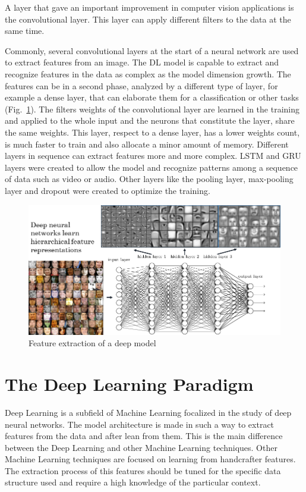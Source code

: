 \documentclass[12pt]{report}
\begin{document}
A layer that gave an important improvement in computer vision applications is the
convolutional layer. This layer can apply different filters to the data at the same time.

Commonly, several convolutional layers at the start of a neural network are used to extract features from an image. 
The DL model is capable to extract and recognize features in the data as complex as the model dimension growth.
The features can be in a second phase, analyzed by a different type of layer, for example a dense layer, that can elaborate them for a classification or other tasks (Fig.~\ref{fig:featuresextract}).
The filters weights of the convolutional layer are learned in the training and applied to the whole input and the neurons that constitute the layer,
share the same weights. This layer, respect to a dense layer, has a lower weights count, is much faster to train and also allocate a minor amount of memory.
Different layers in sequence can extract features more and more complex. 
LSTM and GRU layers were created to allow the model and recognize patterns among a sequence of data such as video or audio.
Other layers like the pooling layer, max-pooling layer and dropout were created to optimize the training.


\begin{figure}[t]
    \centering
    \includegraphics[scale=.5]{layers-features.png}
    \caption{Feature extraction of a deep model \cite{featuresextract}}
    \label{fig:featuresextract}
\end{figure}


\section{The Deep Learning Paradigm}

Deep Learning is a subfield of Machine Learning focalized in the study of deep neural networks.
The model architecture is made in such a way to extract features from the data and after lean from them.
This is the main difference between the Deep Learning and other Machine Learning techniques.
Other Machine Learning techniques are focused on learning from handcrafter features.
The extraction process of this features should be tuned for the specific data structure used and 
require a high knowledge of the particular context.
\end{document}

